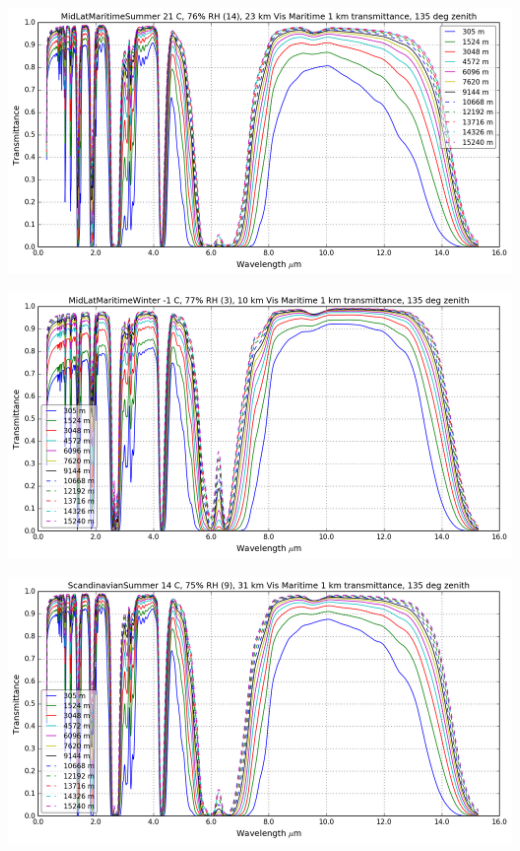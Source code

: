 \documentclass{workpackage}
\begin{document}
\begin{center}
\includegraphics{./pic/Analyse-Standard-Atmospheres_17_3.png}
\end{center}

\begin{center}
\includegraphics{./pic/Analyse-Standard-Atmospheres_17_4.png}
\end{center}

\begin{center}
\includegraphics{./pic/Analyse-Standard-Atmospheres_17_5.png}
\end{center}
\end{document}
